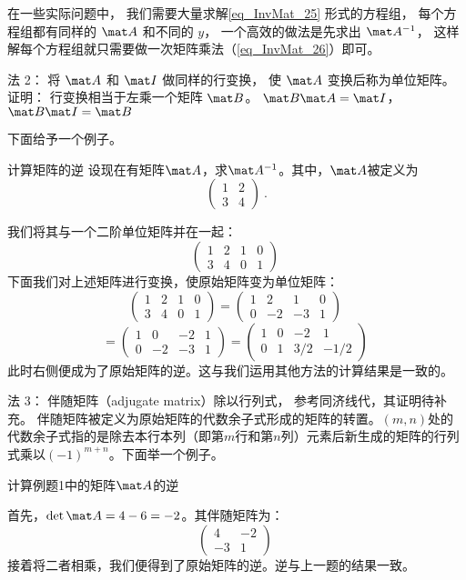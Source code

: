 在一些实际问题中， 我们需要大量求解\autoref{eq_InvMat_25} 形式的方程组， 每个方程组都有同样的 $\mat A$ 和不同的 $y$， 一个高效的做法是先求出 $\mat A^{-1}$， 这样解每个方程组就只需要做一次矩阵乘法（\autoref{eq_InvMat_26}）即可。

法 2： 将 $\mat A$ 和 $\mat I$ 做同样的行变换， 使 $\mat A$ 变换后称为单位矩阵。 
证明： 行变换相当于左乘一个矩阵 $\mat B$。 $\mat B\mat A = \mat I$， $\mat B \mat I = \mat B$

下面给予一个例子。
\begin{example}{计算矩阵的逆}
设现在有矩阵$\mat A$，求$\mat A^{-1}$。其中，$\mat A$被定义为
$$
\left(
    \begin{matrix}
    1&2\\
    3&4
    \end{matrix}
\right)~.
$$
\end{example}
我们将其与一个二阶单位矩阵并在一起：
$$
\left(
    \begin{matrix}
    1&2&1&0\\
    3&4&0&1
    \end{matrix}
\right)~
$$
下面我们对上述矩阵进行变换，使原始矩阵变为单位矩阵：
$$
\left(
    \begin{matrix}
    1&2&1&0\\
    3&4&0&1
    \end{matrix}\right)=\left(
    \begin{matrix}
    1&2&1&0\\
    0&-2&-3&1
    \end{matrix}\right)~$$
    $$
    =\left(
    \begin{matrix}
    1&0&-2&1\\
    0&-2&-3&1
    \end{matrix}\right)=\left(
    \begin{matrix}
    1&0&-2&1\\
    0&1&3/2&-1/2
    \end{matrix}
\right)~
$$
此时右侧便成为了原始矩阵的逆。这与我们运用其他方法的计算结果是一致的。

法 3： 伴随矩阵（adjugate matrix）除以行列式， 参考同济线代，其证明待补充。%
伴随矩阵被定义为原始矩阵的代数余子式形成的矩阵的转置。$(m,n)$处的代数余子式指的是除去本行本列（即第$m$行和第$n$列）元素后新生成的矩阵的行列式乘以$(-1)^{m+n}$。下面举一个例子。
\begin{example}{计算例题1中的矩阵$\mat A$的逆}
\end{example}
首先，$\det\mat A=4-6=-2$。其伴随矩阵为：
$$
\left(
\begin{matrix}
4&-2\\
-3&1
\end{matrix}
\right)~
$$
接着将二者相乘，我们便得到了原始矩阵的逆。逆与上一题的结果一致。